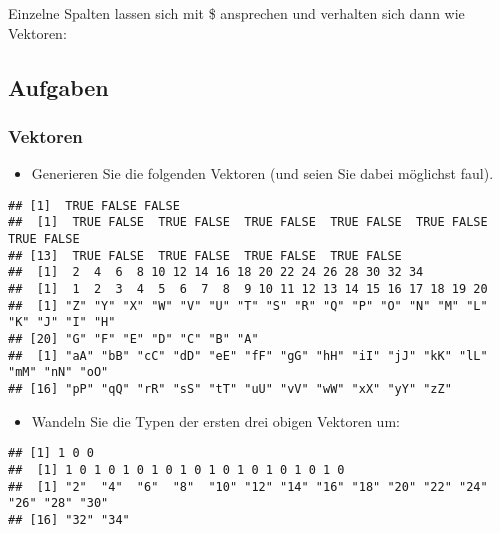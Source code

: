 \documentclass[
  ngerman,
]{article}
\newenvironment{Shaded}{\begin{snugshade}}{\end{snugshade}}
\newcommand{\DocumentationTok}[1]{\textcolor[rgb]{0.56,0.35,0.01}{\textbf{\textit{#1}}}}
\newcommand{\FunctionTok}[1]{\textcolor[rgb]{0.00,0.00,0.00}{#1}}
\newcommand{\NormalTok}[1]{#1}
\newcommand{\SpecialCharTok}[1]{\textcolor[rgb]{0.00,0.00,0.00}{#1}}
\providecommand{\tightlist}{%
  \setlength{\itemsep}{0pt}\setlength{\parskip}{0pt}}
\begin{document}
Einzelne Spalten lassen sich mit \$ ansprechen und verhalten sich dann wie Vektoren:

\begin{Shaded}
\end{Shaded}

\hypertarget{aufgaben-1}{%
\subsection{Aufgaben}\label{aufgaben-1}}

\hypertarget{vektoren-1}{%
\subsubsection{Vektoren}\label{vektoren-1}}

\begin{itemize}
\tightlist
\item
  Generieren Sie die folgenden Vektoren (und seien Sie dabei möglichst faul).
\end{itemize}

\begin{verbatim}
## [1]  TRUE FALSE FALSE
##  [1]  TRUE FALSE  TRUE FALSE  TRUE FALSE  TRUE FALSE  TRUE FALSE  TRUE FALSE
## [13]  TRUE FALSE  TRUE FALSE  TRUE FALSE  TRUE FALSE
##  [1]  2  4  6  8 10 12 14 16 18 20 22 24 26 28 30 32 34
##  [1]  1  2  3  4  5  6  7  8  9 10 11 12 13 14 15 16 17 18 19 20
##  [1] "Z" "Y" "X" "W" "V" "U" "T" "S" "R" "Q" "P" "O" "N" "M" "L" "K" "J" "I" "H"
## [20] "G" "F" "E" "D" "C" "B" "A"
##  [1] "aA" "bB" "cC" "dD" "eE" "fF" "gG" "hH" "iI" "jJ" "kK" "lL" "mM" "nN" "oO"
## [16] "pP" "qQ" "rR" "sS" "tT" "uU" "vV" "wW" "xX" "yY" "zZ"
\end{verbatim}

\begin{itemize}
\tightlist
\item
  Wandeln Sie die Typen der ersten drei obigen Vektoren um:
\end{itemize}

\begin{verbatim}
## [1] 1 0 0
##  [1] 1 0 1 0 1 0 1 0 1 0 1 0 1 0 1 0 1 0 1 0
##  [1] "2"  "4"  "6"  "8"  "10" "12" "14" "16" "18" "20" "22" "24" "26" "28" "30"
## [16] "32" "34"
\end{verbatim}
\end{document}
